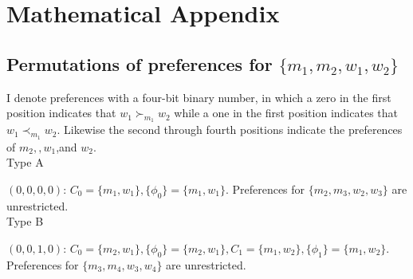 \documentclass[WP]{AEA}
\newtheorem{conj}{Conjecture}
\begin{document}
%




\appendix



\section{Mathematical Appendix}

\subsection{Permutations of preferences for $\{m_1,m_2,w_1,w_2\}$}
I denote preferences with a four-bit binary number, in which a zero in the first position indicates that $w_1\succ_{m_1} w_2$ while a one in the first position indicates that $w_1\prec_{m_1} w_2$. Likewise the second through fourth positions indicate the preferences of $m_2, ,w_1$,and $w_2$.
\\
Type A

$(0,0,0,0)$: $C_0 =\{m_1,w_1\}, \{\phi_0\}=\{m_1,w_1\}$.  Preferences for $\{m_2,m_3,w_2,w_3\}$ are unrestricted.
\\

Type B

$(0,0,1,0)$: $C_0 =\{m_2,w_1\}, \{\phi_0\}=\{m_2,w_1\}, C_1 =\{m_1,w_2\}, \{\phi_1\}=\{m_1,w_2\}$.  Preferences for $\{m_3,m_4,w_3,w_4\}$ are unrestricted.
\end{document}
